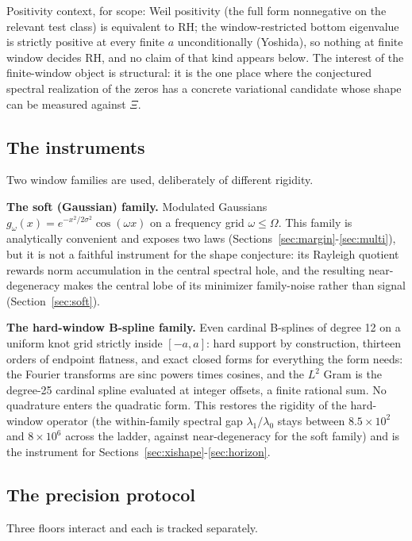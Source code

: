 \documentclass[10pt]{article}
\begin{document}
Positivity context, for scope: Weil positivity (the full form nonnegative on the relevant test class) is equivalent to RH; the window-restricted bottom eigenvalue is strictly positive at every finite $a$ unconditionally (Yoshida), so nothing at finite window decides RH, and no claim of that kind appears below. The interest of the finite-window object is structural: it is the one place where the conjectured spectral realization of the zeros has a concrete variational candidate whose shape can be measured against $\Xi$.

\subsection{The instruments}\label{sec:instruments}

Two window families are used, deliberately of different rigidity.

\textbf{The soft (Gaussian) family.} Modulated Gaussians $g_\omega(x) = e^{-x^2/2\sigma^2}\cos(\omega x)$ on a frequency grid $\omega \le \Omega$. This family is analytically convenient and exposes two laws (Sections~\ref{sec:margin}-\ref{sec:multi}), but it is not a faithful instrument for the shape conjecture: its Rayleigh quotient rewards norm accumulation in the central spectral hole, and the resulting near-degeneracy makes the central lobe of its minimizer family-noise rather than signal (Section~\ref{sec:soft}).

\textbf{The hard-window B-spline family.} Even cardinal B-splines of degree 12 on a uniform knot grid strictly inside $[-a, a]$: hard support by construction, thirteen orders of endpoint flatness, and exact closed forms for everything the form needs: the Fourier transforms are sinc powers times cosines, and the $L^2$ Gram is the degree-25 cardinal spline evaluated at integer offsets, a finite rational sum. No quadrature enters the quadratic form. This restores the rigidity of the hard-window operator (the within-family spectral gap $\lambda_1/\lambda_0$ stays between $8.5 \times 10^2$ and $8 \times 10^6$ across the ladder, against near-degeneracy for the soft family) and is the instrument for Sections~\ref{sec:xishape}-\ref{sec:horizon}.

\subsection{The precision protocol}\label{sec:protocol}

Three floors interact and each is tracked separately.
\end{document}
